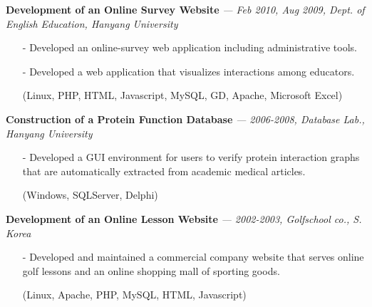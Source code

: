   \vspace{-0.15in}
{\bf Development of an Online Survey Website}
  {\it \footnotesize --- Feb 2010, Aug 2009, Dept. of English Education, Hanyang University}
  \begin{itemize}[leftmargin=*]
    \setlength\itemsep{-0.02in}
     \item[-] Developed an online-survey web application including administrative tools.
     \item[-] Developed a web application that visualizes interactions among educators.
     \item[] {\small(Linux, PHP, HTML, Javascript, MySQL, GD, Apache, Microsoft Excel)}
  \end{itemize}

  \vspace{-0.15in}
  {\bf Construction of a Protein Function Database} 
    {\it \footnotesize --- 2006-2008, Database Lab., Hanyang University}
    \begin{itemize}[leftmargin=*]
    \setlength\itemsep{-0.02in}
    \item[-] Developed a GUI environment for users to verify protein interaction graphs
             that are automatically extracted from academic medical articles.
    \item[] {\small(Windows, SQLServer, Delphi)}
    \end{itemize}

    
  \vspace{-0.15in}
  {\bf Development of an Online Lesson Website}
    {\it \footnotesize --- 2002-2003, Golfschool co., S. Korea}
    \begin{itemize}[leftmargin=*]
    \setlength\itemsep{-0.02in}
     \item[-] Developed and maintained a commercial company website that 
              serves online golf lessons and an online shopping mall of sporting goods.
     \item[]  {\small(Linux, Apache, PHP, MySQL, HTML, Javascript)}
    \end{itemize}
